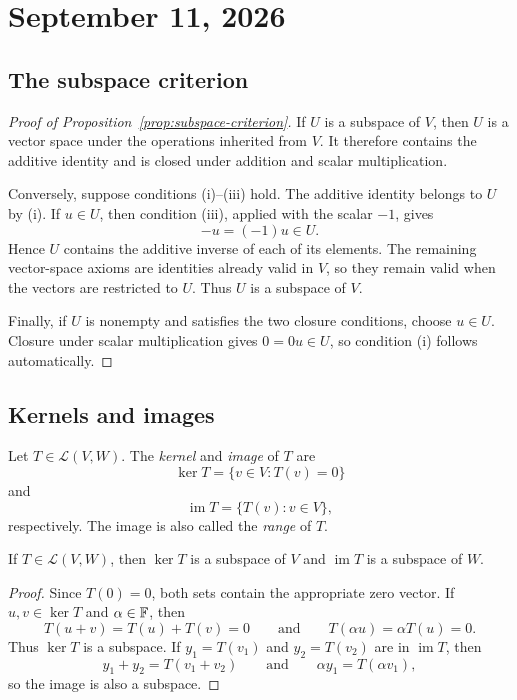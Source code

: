 \section{September 11, 2026}

\subsection{The subspace criterion}

\begin{proof}[Proof of Proposition~\ref{prop:subspace-criterion}]
  If $U$ is a subspace of $V$, then $U$ is a vector space under the
  operations inherited from $V$. It therefore contains the additive
  identity and is closed under addition and scalar multiplication.

  Conversely, suppose conditions (i)--(iii) hold. The additive identity
  belongs to $U$ by (i). If $u\in U$, then condition (iii), applied with
  the scalar $-1$, gives
  \[
    -u=(-1)u\in U.
  \]
  Hence $U$ contains the additive inverse of each of its elements. The
  remaining vector-space axioms are identities already valid in $V$, so
  they remain valid when the vectors are restricted to $U$. Thus $U$ is
  a subspace of $V$.

  Finally, if $U$ is nonempty and satisfies the two closure conditions,
  choose $u\in U$. Closure under scalar multiplication gives
  $0=0u\in U$, so condition (i) follows automatically.
\end{proof}

\subsection{Kernels and images}

\begin{definition}
  Let $T\in\mathcal L(V,W)$. The \emph{kernel} and \emph{image} of $T$
  are
  \[
    \ker T=\{v\in V:T(v)=0\}
  \]
  and
  \[
    \operatorname{im}T=\{T(v):v\in V\},
  \]
  respectively. The image is also called the \emph{range} of $T$.
\end{definition}

\begin{proposition}
  If $T\in\mathcal L(V,W)$, then $\ker T$ is a subspace of $V$ and
  $\operatorname{im}T$ is a subspace of $W$.
\end{proposition}

\begin{proof}
  Since $T(0)=0$, both sets contain the appropriate zero vector. If
  $u,v\in\ker T$ and $\alpha\in\mathbb{F}$, then
  \[
    T(u+v)=T(u)+T(v)=0
    \qquad\text{and}\qquad
    T(\alpha u)=\alpha T(u)=0.
  \]
  Thus $\ker T$ is a subspace. If $y_1=T(v_1)$ and $y_2=T(v_2)$ are in
  $\operatorname{im}T$, then
  \[
    y_1+y_2=T(v_1+v_2)
    \qquad\text{and}\qquad
    \alpha y_1=T(\alpha v_1),
  \]
  so the image is also a subspace.
\end{proof}

